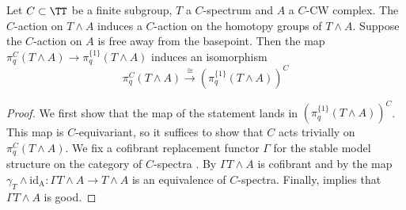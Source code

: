 \begin{lem}\label{lem:switchfixedpoints}
Let $C\subset \TT$ be a finite subgroup, $T$ a $C$-spectrum
and $A$ a $C$-CW complex.
The $C$-action on $ T\wedge A$ induces
a $C$-action on the homotopy groups of $T\wedge A$.
Suppose the $C$-action on $A$ is free away from
the basepoint.
Then the map $\pi_q^C( T\wedge A)\to 
\pi_q^{\{1\}}(T\wedge A)$ induces an isomorphism
\[\pi_q^C( T\wedge A)\xrightarrow{\cong} 
\left(\pi_q^{\{1\}}(  T\wedge A)\right)^C\]
\end{lem}
\begin{proof}
We first show that the map of the statement lands in 
$\left(\pi_q^{\{1\}}(  T\wedge A)\right)^C$. This map
is $C$-equivariant, so it suffices to show that $C$
acts trivially on $\pi_q^C( T\wedge A)$.
We fix a cofibrant replacement functor $\Gamma$ for
the stable model structure on the category of $C$-spectra
\cite[Theorem III.4.2, \pno~47]{mandellmay}. 
By \cite[Lemma III.4.14, \pno~50]{mandellmay} $\Gamma T\wedge A$
is cofibrant and by \cite[Theorem III.3.11, \pno~47]{mandellmay} the map
$\gamma_T\wedge\mathrm{id_A}: \Gamma T\wedge A
\to T\wedge A$ is an equivalence of $C$-spectra.
Finally, \cite[Lemma~5.10, \pno~1514]{rvadams} implies
that $\Gamma T\wedge A$ is good.


\end{proof}

